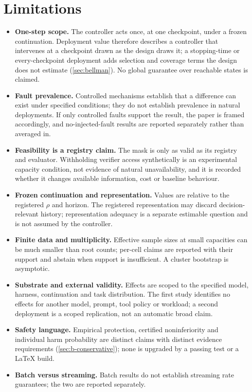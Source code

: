 \section{Limitations}
\label{sec:b-limitations}

\begin{itemize}[leftmargin=1.4em]
\item \textbf{One-step scope.} The controller acts once, at one checkpoint,
  under a frozen continuation.  Deployment value therefore describes a
  controller that intervenes at a checkpoint drawn as the design draws it; a
  stopping-time or every-checkpoint deployment adds selection and coverage terms
  the design does not estimate (\cref{sec:bellman}).  No global guarantee over
  reachable states is claimed.
\item \textbf{Fault prevalence.} Controlled mechanisms establish that a
  difference can exist under specified conditions; they do not establish
  prevalence in natural deployments.  If only controlled faults support the
  result, the paper is framed accordingly, and no-injected-fault results are
  reported separately rather than averaged in.
\item \textbf{Feasibility is a registry claim.} The mask is only as valid as its
  registry and evaluator.  Withholding verifier access synthetically is an
  experimental capacity condition, not evidence of natural unavailability, and
  it is recorded whether it changes available information, cost or baseline
  behaviour.
\item \textbf{Frozen continuation and representation.} Values are relative to
  the registered $\rho$ and horizon.  The registered representation may discard
  decision-relevant history; representation adequacy is a separate estimable
  question and is not assumed by the controller.
\item \textbf{Finite data and multiplicity.} Effective sample sizes at small
  capacities can be much smaller than root counts; per-cell claims are reported
  with their support and abstain when support is insufficient.  A cluster
  bootstrap is asymptotic.
\item \textbf{Substrate and external validity.} Effects are scoped to the
  specified model, harness, continuation and task distribution.  The first study
  identifies no effects for another model, prompt, tool policy or workload; a
  second deployment is a scoped replication, not an automatic broad claim.
\item \textbf{Safety language.} Empirical protection, certified noninferiority
  and individual harm probability are distinct claims with distinct evidence
  requirements (\cref{sec:b-conservative}); none is upgraded by a passing test
  or a LaTeX build.
\item \textbf{Batch versus streaming.} Batch results do not establish streaming
  rate guarantees; the two are reported separately.
\end{itemize}
